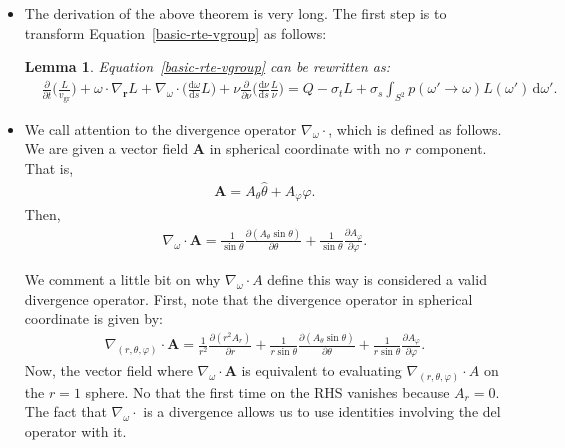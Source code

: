 \documentclass[10pt]{article}
\newtheorem{lemma}{Lemma}[section]
\newcommand{\dee}{\mathrm{d}}
\newcommand{\ve}[1]{\mathbf{#1}}
\newcommand{\ra}{\rightarrow}
\newcommand{\group}{\mathrm{gr}}
\begin{document}
\begin{itemize}
    \item The derivation of the above theorem is very long. The first step is to transform Equation~\eqref{basic-rte-vgroup} as follows:
    \begin{lemma} \label{rte-first-rewrite}
      Equation~\eqref{basic-rte-vgroup} can be rewritten as:
      \begin{align}
        & \frac{\partial}{\partial t}\bigg(\frac{L}{v_\group}\bigg)
        + \omega \cdot \nabla_{\ve{r}} L
        + \nabla_{\omega} \cdot \bigg( \frac{\dee \omega}{\dee s} L \bigg)
        + \nu \frac{\partial}{\partial \nu} \bigg( \frac{\dee \nu}{\dee s} \frac{L}{\nu} \bigg)
        = Q - \sigma_t L
        + \sigma_s \int_{S^2} p(\omega' \ra \omega) L(\omega')\, \dee \omega'. \label{rte-first-rewrite-eqn}
      \end{align}
    \end{lemma}

    \item We call attention to the divergence operator $\nabla_\omega \cdot$, which is defined as follows. We are given a vector field $\ve{A}$ in spherical coordinate with no $r$ component. That is,
    \begin{align*}
      \ve{A} = A_\theta \hat \theta + A_\varphi \hat\varphi.
    \end{align*}
    Then, 
    \begin{align*}
      \nabla_\omega \cdot \ve{A} = \frac{1}{\sin \theta} \frac{\partial (A_\theta \sin \theta )}{\partial \theta} + \frac{1}{\sin\theta} \frac{\partial A_\varphi}{\partial \varphi}.
    \end{align*}

    We comment a little bit on why $\nabla_\omega \cdot A$ define this way is considered a valid divergence operator. First, note that the divergence operator in spherical coordinate is given by:
    \begin{align*}
      \nabla_{(r,\theta,\varphi)} \cdot \ve{A} 
      = \frac{1}{r^2} \frac{\partial(r^2 A_r)}{\partial r}
      + \frac{1}{r\sin\theta} \frac{\partial (A_\theta \sin\theta)}{\partial \theta}
      + \frac{1}{r\sin\theta} \frac{\partial A_\varphi}{\partial\varphi}.
    \end{align*}
    Now, the vector field where $\nabla_\omega \cdot \ve{A}$ is equivalent to evaluating $\nabla_{(r, \theta,\varphi)} \cdot A$ on the $r = 1$ sphere. No that the first time on the RHS vanishes because $A_r = 0$. The fact that $\nabla_\omega\cdot$ is a divergence allows us to use identities involving the del operator with it.


\end{itemize}
\end{document}
